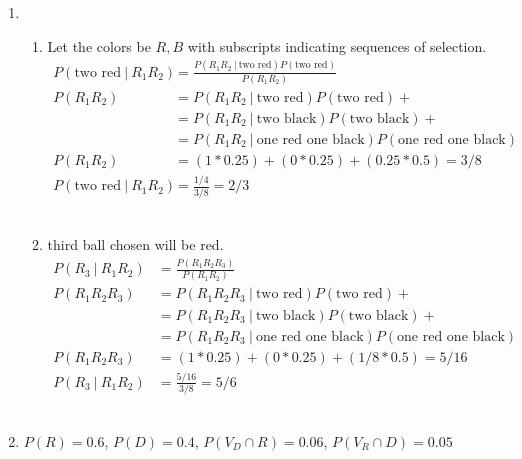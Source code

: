 \begin{enumerate}
\begin{enumerate}
		
	\end{enumerate}
	
	\item \begin{enumerate}
		\item Let the colors be $ R, B $ with subscripts indicating sequences of selection. \\
		
		
			\begin{align}
				P(\text{two red}\ |\ R_1 R_2) &= \frac{P(R_1 R_2\ |\ \text{two red}) P(\text{two red})}{P(R_1 R_2)} \\
				P(R_1 R_2) 	&= P(R_1 R_2\ |\ \text{two red}) P(\text{two red}) + \nonumber \\
				&= P(R_1 R_2\ |\ \text{two black}) P(\text{two black}) + \nonumber \\ 
				&= P(R_1 R_2\ |\ \text{one red one black}) P(\text{one red one black}) \\
				P(R_1 R_2) 	&= ( 1 * 0.25 ) + (0 * 0.25) + (0.25 * 0.5) = 3/8 \\
				P(\text{two red}\ |\ R_1 R_2) &= \frac{1/4}{3/8} = 2/3
			\end{align} \\
		
		
		\item third ball chosen will be red. \\
		
			\begin{align}
				P(R_3\ |\ R_1 R_2) &= \frac{P(R_1 R_2 R_3)}{P(R_1 R_2)} \\
				P(R_1 R_2 R_3) 	&= P(R_1 R_2 R_3\ |\ \text{two red}) P(\text{two red}) + \nonumber \\
				&= P(R_1 R_2 R_3\ |\ \text{two black}) P(\text{two black}) + \nonumber \\ 
				&= P(R_1 R_2 R_3\ |\ \text{one red one black}) P(\text{one red one black}) \\
				P(R_1 R_2 R_3) 	&= ( 1 * 0.25 ) + (0 * 0.25) + (1/8 * 0.5) = 5/16 \\
				P(R_3\ |\ R_1 R_2) &= \frac{5/16}{3/8} = 5/6
			\end{align} \\
		
	\end{enumerate}
	
	\item $ P(R) = 0.6 $, $ P(D) = 0.4 $, $ P(V_D \cap R) = 0.06 $, $ P(V_R \cap D) = 0.05 $ \\
	

\end{enumerate}
